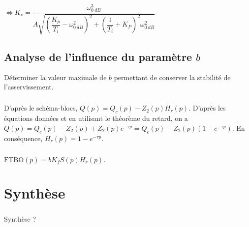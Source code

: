 \documentclass[10pt,fleqn]{article} %
\begin{document}
$\Leftrightarrow 
K_v  =\dfrac{\omega_{\SI{0}{dB}}^3}{A\sqrt{\left(\dfrac{K_p}{T_i }-\omega_{\SI{0}{dB}}^2 \right)^2+\left(\dfrac{1}{T_i}+ K_P\right)^2\omega_{\SI{0}{dB}}^2}}$


\subparagraph{}
\subparagraph{}

\subsection{Analyse de l’influence du paramètre $b$}
\begin{obj}
Déterminer la valeur maximale de $b$ permettant de conserver la stabilité de l’asservissement.
\end{obj}



\subparagraph{}

D'après le schéma-blocs, $Q(p)=Q_c(p)-Z_2(p)H_r(p)$. 
D'après les équations données et en utilisant le théorème du retard, on a $Q(p)=Q_c(p)-Z_2(p)+Z_2(p)e^{-\tau p}=Q_c(p)-Z_2(p)\left(1-e^{-\tau p}\right)$. En conséquence, $H_r(p)=1-e^{-\tau p}$.


\subparagraph{}
$\text{FTBO}(p)=bK_f S(p)H_r(p)$.

\subparagraph{}

\section{Synthèse}

\subparagraph{}
Synthèse ?
\end{document}
